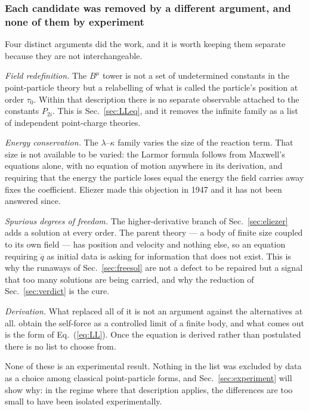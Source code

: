 \documentclass[preprint]{aastex701}
\newcommand{\taunought}{\tau_0}
\begin{document}
\subsubsection{Each candidate was removed by a different argument, and none of
them by experiment}
\label{sec:verdicts}

Four distinct arguments did the work, and it is worth keeping them separate
because they are not interchangeable.

\emph{Field redefinition.} The $B^\mu$ tower is not a set of undetermined
constants in the point-particle theory but a relabelling of what is called the
particle's position at order $\taunought$. Within that description there is no
separate observable attached to the constants $P_{2i}$. This is
Sec.~\ref{sec:LLeq}, and it removes the infinite family as a list of
independent point-charge theories.

\emph{Energy conservation.} The $\lambda$--$\kappa$ family varies the size of
the reaction term. That size is not available to be varied: the Larmor formula
follows from Maxwell's equations alone, with no equation of motion anywhere in
its derivation, and requiring that the energy the particle loses equal the
energy the field carries away fixes the coefficient. Eliezer made this objection
in 1947 and it has not been answered since.

\emph{Spurious degrees of freedom.} The higher-derivative branch of
Sec.~\ref{sec:eliezer} adds a solution at every order. The parent theory --- a
body of finite size coupled to its own field --- has position and velocity and
nothing else, so an equation requiring $\dddot q$ as initial data is asking for
information that does not exist. This is why the runaways of
Sec.~\ref{sec:freesol} are not a defect to be repaired but a signal that too
many solutions are being carried, and why the reduction of
Sec.~\ref{sec:verdict} is the cure.

\emph{Derivation.} What replaced all of it is not an argument against the
alternatives at all. \citet{gralla2009} obtain the self-force as a controlled
limit of a finite body, and what comes out is the form of Eq.~(\ref{eq:LL}).
Once the equation is derived rather than postulated there is no list to choose
from.

None of these is an experimental result. Nothing in the list was excluded by
data as a choice among classical point-particle forms, and
Sec.~\ref{sec:experiment} will show why: in the regime where that description
applies, the differences are too small to have been isolated experimentally.
\end{document}
